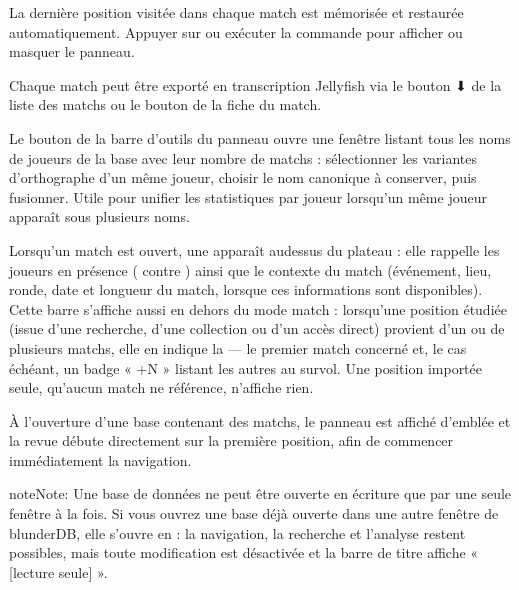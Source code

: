 \documentclass[letterpaper,10pt,french]{sphinxmanual}
\begin{document}
\sphinxAtStartPar
La dernière position visitée dans chaque match est mémorisée et restaurée
automatiquement. Appuyer sur  ou exécuter la commande 
pour afficher ou masquer le panneau.

\sphinxAtStartPar
Chaque match peut être exporté en transcription Jellyfish  via le
bouton ⬇ de la liste des matchs ou le bouton  de la fiche du match.

\sphinxAtStartPar
Le bouton  de la barre d’outils du panneau ouvre une
fenêtre listant tous les noms de joueurs de la base avec leur nombre de
matchs : sélectionner les variantes d’orthographe d’un même joueur, choisir le
nom canonique à conserver, puis fusionner. Utile pour unifier les statistiques
par joueur lorsqu’un même joueur apparaît sous plusieurs noms.

\sphinxAtStartPar
Lorsqu’un match est ouvert, une  apparaît au\sphinxhyphen{}dessus du
plateau : elle rappelle les joueurs en présence ( contre )
ainsi que le contexte du match (événement, lieu, ronde, date et longueur du
match, lorsque ces informations sont disponibles). Cette barre s’affiche aussi
en dehors du mode match : lorsqu’une position étudiée (issue d’une recherche,
d’une collection ou d’un accès direct) provient d’un ou de plusieurs matchs,
elle en indique la  — le premier match concerné et, le cas
échéant, un badge « +N » listant les autres au survol. Une position importée
seule, qu’aucun match ne référence, n’affiche rien.

\sphinxAtStartPar
À l’ouverture d’une base contenant des matchs, le panneau  est affiché
d’emblée et la revue débute directement sur la première position, afin de
commencer immédiatement la navigation.

\begin{sphinxadmonition}{note}{Note:}
\sphinxAtStartPar
Une base de données ne peut être ouverte en écriture que par une seule
fenêtre à la fois. Si vous ouvrez une base déjà ouverte dans une autre
fenêtre de blunderDB, elle s’ouvre en  : la navigation, la
recherche et l’analyse restent possibles, mais toute modification est
désactivée et la barre de titre affiche « {[}lecture seule{]} ».
\end{sphinxadmonition}
\end{document}

